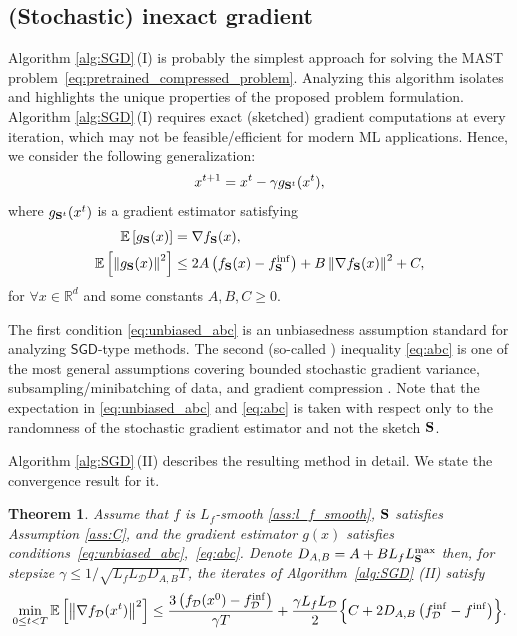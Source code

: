 \documentclass{article}
\newcommand\br[1]{\left ( #1 \right )}
\newcommand{\SGD}{$\mathsf{SGD}$}
\newcommand{\bb}{\mathbb}
\newcommand{\Exp}[1]{{\bb E}\left[#1\right]}
\newtheorem{theorem}{Theorem}
\theoremstyle{plain}
\newcommand{\tf}{f_{\mathcal{D}}}
\newcommand{\mS}{{\bf S}}
\theoremstyle{plain}
\theoremstyle{definition}
\theoremstyle{remark}
\begin{document}
\subsection{(Stochastic) inexact gradient}
Algorithm \ref{alg:SGD}\,(I) is probably the simplest approach for solving the MAST problem~\eqref{eq:pretrained_compressed_problem}. Analyzing this algorithm isolates and highlights the unique properties of the proposed problem formulation. Algorithm \ref{alg:SGD}\,(I) requires exact (sketched) gradient computations at every iteration, which may not be feasible/efficient for modern ML applications. Hence, we consider the following generalization:
\begin{equation} \label{eq:abc_sgd}
	x^{t+1} = x^t - \gamma g_{\mS^t}(x^t),
\end{equation}
where $g_{\mS^t}(x^t)$ is a gradient estimator satisfying
\begin{align} \label{eq:unbiased_abc}
	\Exp{g_{\mS}(x)} &= \nabla f_{\mS}(x),\\
	\label{eq:abc}
	\Exp{\left\|g_{\mS}(x)\right\|^2} &\leq 2A\left(f_{\mS}(x) - f^{\inf}_{\mS}\right) + B\left\|\nabla f_{\mS}(x)\right\|^2 + C,
\end{align}
for $\forall x \in\mathbb{R}^d$ and some constants $A, B, C \geq 0$.

The first condition \eqref{eq:unbiased_abc} is an unbiasedness assumption standard for analyzing \SGD-type methods. The second (so-called ) inequality \eqref{eq:abc} is one of the most general assumptions covering bounded stochastic gradient variance, subsampling/minibatching of data, and gradient compression \citep{khaled2020better, demidovich2023guide}. Note that the expectation in \eqref{eq:unbiased_abc} and \eqref{eq:abc} is taken with respect only to the randomness of the stochastic gradient estimator and not the sketch $\mS$.

Algorithm \ref{alg:SGD}\,(II) describes the resulting method in detail. We state the convergence result for it.

\begin{theorem} \label{thm:abc_ncvx}
	Assume that $f$ is $L_f$-smooth \eqref{ass:l_f_smooth}, $\mS$ satisfies Assumption \ref{ass:C}, and the gradient estimator $g(x)$ satisfies conditions~\ref{eq:unbiased_abc},~\ref{eq:abc}.
	Denote $D_{A, B} = A + B L_f L_{\mS}^{\max}$ then, for stepsize $\gamma \leq 1/\sqrt{L_f L_{\mathcal{D}} D_{A, B} T}$, the iterates of Algorithm~\ref{alg:SGD} (II) satisfy
	\begin{equation*} \label{eq:ABC_noncvx_res}
			\min_{0 \leq t < T} \Exp{\left\|\nabla \tf(x^t)\right\|^2} \leq \frac{3 \br{\tf(x^0) - \tf^{\inf}}}{\gamma T} + \frac{\gamma L_f L_{\mathcal{D}}}{2}
			\Bigl\{C + 2 D_{A, B} \left(\tf^{\inf} - f^{\inf}\right)\Bigr\}.
	\end{equation*}
\end{theorem}
\end{document}
